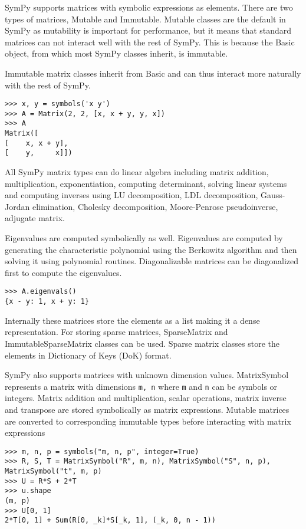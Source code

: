 SymPy supports matrices with symbolic expressions as elements. There are two
types of matrices, Mutable and Immutable. Mutable classes are the default in
SymPy as mutability is important for performance, but it means that standard
matrices can not interact well with the rest of SymPy. This is because the
Basic object, from which most SymPy classes inherit, is immutable.

Immutable matrix classes inherit from Basic and can thus interact more
naturally with the rest of SymPy.

\begin{verbatim}
>>> x, y = symbols('x y')
>>> A = Matrix(2, 2, [x, x + y, y, x])
>>> A
Matrix([
[    x, x + y],
[    y,     x]])
\end{verbatim}

All SymPy matrix types can do linear algebra including matrix addition,
multiplication, exponentiation, computing determinant, solving linear
systems and computing inverses using LU decomposition, LDL decomposition,
Gauss-Jordan elimination, Cholesky decomposition, Moore-Penrose pseudoinverse,
adjugate matrix.

Eigenvalues are computed symbolically as well. Eigenvalues are computed by
generating the characteristic polynomial using the Berkowitz algorithm and
then solving it using polynomial routines. Diagonalizable matrices can be
diagonalized first to compute the eigenvalues.

\begin{verbatim}
>>> A.eigenvals()
{x - y: 1, x + y: 1}
\end{verbatim}

Internally these matrices store the elements as a list making it a dense
representation. For storing sparse matrices, SparseMatrix and
ImmutableSparseMatrix classes can be used. Sparse matrix classes store
the elements in Dictionary of Keys (DoK) format.

SymPy also supports matrices with unknown dimension values. MatrixSymbol
represents a matrix with dimensions \verb|m, n| where \verb|m| and \verb|n|
can be symbols or integers. Matrix addition and multiplication, scalar
operations, matrix inverse and transpose are stored symbolically as
matrix expressions. Mutable matrices are converted to corresponding immutable
types before interacting with matrix expressions

\begin{verbatim}
>>> m, n, p = symbols("m, n, p", integer=True)
>>> R, S, T = MatrixSymbol("R", m, n), MatrixSymbol("S", n, p), MatrixSymbol("t", m, p)
>>> U = R*S + 2*T
>>> u.shape
(m, p)
>>> U[0, 1]
2*T[0, 1] + Sum(R[0, _k]*S[_k, 1], (_k, 0, n - 1))
\end{verbatim}

